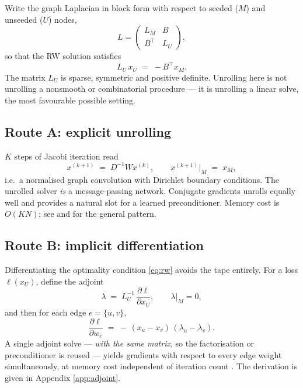 \documentclass[11pt,a4paper]{article}
\newcommand{\Lap}{L}
\newcommand{\LU}{\Lap_{U}}
\newcommand{\xU}{x_{U}}
\newcommand{\xM}{x_{M}}
\newcommand{\we}{w_{e}}
\theoremstyle{definition}
\begin{document}
Write the graph Laplacian in block form with respect to seeded ($M$) and
unseeded ($U$) nodes,
\begin{equation}
  \Lap = \begin{pmatrix} \Lap_{M} & B \\ B^{\!\top} & \LU \end{pmatrix},
\end{equation}
so that the RW solution satisfies
\begin{equation}
  \LU\,\xU \;=\; -B^{\!\top}\xM .
  \label{eq:rw}
\end{equation}
The matrix $\LU$ is sparse, symmetric and positive definite. Unrolling
here is not unrolling a nonsmooth or combinatorial procedure --- it is
unrolling a linear solve, the most favourable possible setting.

\subsection{Route A: explicit unrolling}

$K$ steps of Jacobi iteration read
\begin{equation}
  x^{(k+1)} \;=\; D^{-1} W x^{(k)}, \qquad
  x^{(k+1)}\big|_{M} \;=\; \xM ,
\end{equation}
i.e.\ a normalised graph convolution with Dirichlet boundary conditions.
The unrolled solver \emph{is} a message-passing network. Conjugate
gradients unrolls equally well and provides a natural slot for a learned
preconditioner. Memory cost is $O(KN)$; see \citet{gregor2010learning}
and \citet{monga2021algorithm} for the general pattern.

\subsection{Route B: implicit differentiation}

Differentiating the optimality condition \eqref{eq:rw} avoids the tape
entirely. For a loss $\ell(\xU)$, define the adjoint
\begin{equation}
  \lambda \;=\; \LU^{-1}\,\frac{\partial \ell}{\partial \xU},
  \qquad \lambda\big|_{M} = 0 ,
\end{equation}
and then for each edge $e=\{u,v\}$,
\begin{equation}
  \boxed{\;
  \frac{\partial \ell}{\partial \we}
  \;=\; -\,(x_u - x_v)\,(\lambda_u - \lambda_v).
  \;}
  \label{eq:adjoint}
\end{equation}
A single adjoint solve --- \emph{with the same matrix}, so the
factorisation or preconditioner is reused --- yields gradients with
respect to every edge weight simultaneously, at memory cost independent
of iteration count \citep{amos2017optnet,bai2019deep}. The derivation is
given in Appendix \ref{app:adjoint}.
\end{document}
